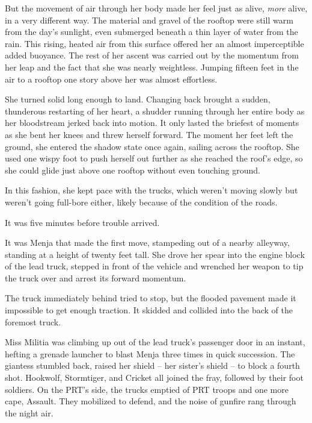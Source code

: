But the movement of air through her body made her feel just as alive, \emph{more} alive, in a very different way.  The material and gravel of the rooftop were still warm from the day's sunlight, even submerged beneath a thin layer of water from the rain.  This rising, heated air from this surface offered her an almost imperceptible added buoyance.  The rest of her ascent was carried out by the momentum from her leap and the fact that she was nearly weightless.  Jumping fifteen feet in the air to a rooftop one story above her was almost effortless.



She turned solid long enough to land.  Changing back brought a sudden, thunderous restarting of her heart, a shudder running through her entire body as her bloodstream jerked back into motion.  It only lasted the briefest of moments as she bent her knees and threw herself forward.  The moment her feet left the ground, she entered the shadow state once again, sailing across the rooftop.  She used one wispy foot to push herself out further as she reached the roof's edge, so she could glide just above one rooftop without even touching ground.



In this fashion, she kept pace with the trucks, which weren't moving slowly but weren't going full-bore either, likely because of the condition of the roads.



It was five minutes before trouble arrived.



It was Menja that made the first move, stampeding out of a nearby alleyway, standing at a height of twenty feet tall.  She drove her spear into the engine block of the lead truck, stepped in front of the vehicle and wrenched her weapon to tip the truck over and arrest its forward momentum.



The truck immediately behind tried to stop, but the flooded pavement made it impossible to get enough traction.  It skidded and collided into the back of the foremost truck.



Miss Militia was climbing up out of the lead truck's passenger door in an instant, hefting a grenade launcher to blast Menja three times in quick succession.  The giantess stumbled back, raised her shield – her sister's shield – to block a fourth shot.  Hookwolf, Stormtiger, and Cricket all joined the fray, followed by their foot soldiers.  On the PRT's side, the trucks emptied of PRT troops and one more cape, Assault.  They mobilized to defend, and the noise of gunfire rang through the night air.



